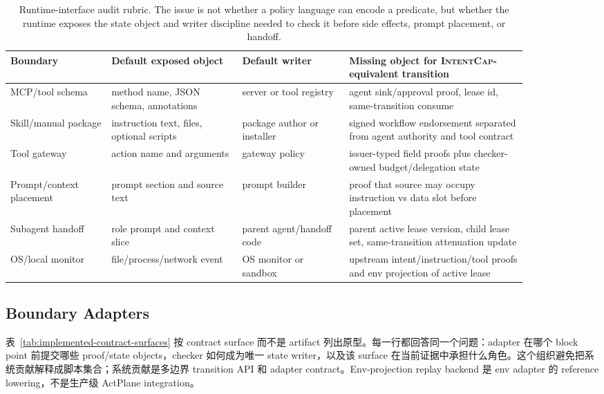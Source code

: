\documentclass[UTF8,a4paper,11pt]{ctexart}
\newcommand{\sys}{\textsc{IntentCap}\xspace}
\begin{document}
\begin{table}[t]
\centering
\scriptsize
\setlength{\tabcolsep}{1.6pt}
\caption{Runtime-interface audit rubric. The issue is not whether a policy language can encode a predicate, but whether the runtime exposes the state object and writer discipline needed to check it before side effects, prompt placement, or handoff.}
\label{tab:runtime-interface-audit}
\begin{tabular}{p{0.17\linewidth}p{0.22\linewidth}p{0.18\linewidth}p{0.30\linewidth}}
\toprule
Boundary & Default exposed object & Default writer & Missing object for \sys-equivalent transition \\
\midrule
MCP/tool schema & method name, JSON schema, annotations & server or tool registry & agent sink/approval proof, lease id, same-transition consume \\
Skill/manual package & instruction text, files, optional scripts & package author or installer & signed workflow endorsement separated from agent authority and tool contract \\
Tool gateway & action name and arguments & gateway policy & issuer-typed field proofs plus checker-owned budget/delegation state \\
Prompt/context placement & prompt section and source text & prompt builder & proof that source may occupy instruction vs data slot before placement \\
Subagent handoff & role prompt and context slice & parent agent/handoff code & parent active lease version, child lease set, same-transition attenuation update \\
OS/local monitor & file/process/network event & OS monitor or sandbox & upstream intent/instruction/tool proofs and env projection of active lease \\
\bottomrule
\end{tabular}
\end{table}

\subsection{Boundary Adapters}

表~\ref{tab:implemented-contract-surfaces} 按 contract surface 而不是 artifact 列出原型。每一行都回答同一个问题：adapter 在哪个 block point 前提交哪些 proof/state objects，checker 如何成为唯一 state writer，以及该 surface 在当前证据中承担什么角色。这个组织避免把系统贡献解释成脚本集合；系统贡献是多边界 transition API 和 adapter contract。Env-projection replay backend 是 env adapter 的 reference lowering，不是生产级 ActPlane integration。
\end{document}
